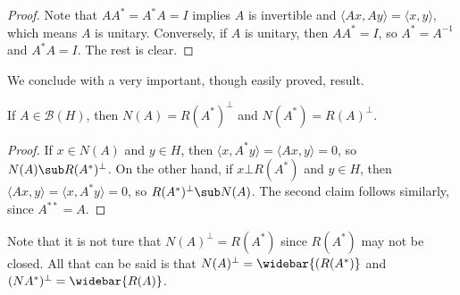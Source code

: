 \begin{proof}
Note that $AA^*=A^*A=I$ implies $A$ is invertible and $\langle Ax,Ay\rangle=\langle x,y\rangle$, which means $A$ is unitary. Conversely, if $A$ is unitary, then $AA^*=I$, so $A^*=A^{-1}$ and $A^*A=I$. The rest is clear.
\end{proof}
We conclude with a very important, though easily proved, result.
\begin{theorem}\label{Hilbert space kernel and adjoint}
If $A\in\mathcal{B}(H)$, then $N(A)=R(A^*)^{\bot}$ and $N(A^*)=R(A)^\bot$.
\end{theorem}
\begin{proof}
If $x\in N(A)$ and $y\in H$, then $\langle x,A^*y\rangle=\langle Ax,y\rangle=0$, so $N(A)\sub R(A^*)^\bot$. On the other hand, if $x\bot R(A^*)$ and $y\in H$, then $\langle Ax,y\rangle=\langle x,A^*y\rangle=0$, so $R(A^*)^\bot\sub N(A)$. The second claim follows similarly, since $A^{**}=A$.
\end{proof}
Note that it is not ture that $N(A)^\bot=R(A^*)$ since $R(A^*)$ may not be closed. All that can be said is that $N(A)^\bot=\widebar{(R(A^*)}$ and $(NA^*)^\bot=\widebar{R(A)}$.
